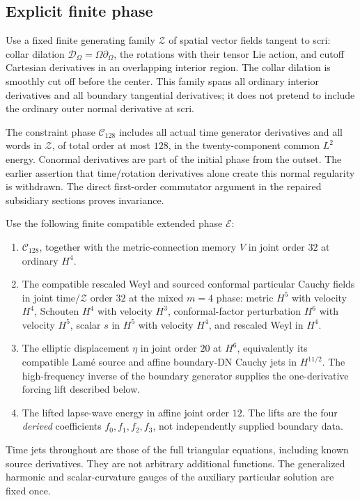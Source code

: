 \subsection{Explicit finite phase}
Use a fixed finite generating family $\mathcal Z$ of spatial vector fields
tangent to scri: collar dilation
$\mathcal D_\Omega=\Omega\partial_\Omega$, the rotations with their tensor
Lie action, and cutoff Cartesian derivatives in an overlapping interior
region. The collar dilation is smoothly cut off before the center.
This family spans all ordinary interior derivatives and all boundary
tangential derivatives; it does not pretend to include the ordinary
outer normal derivative at scri.

The constraint phase $\mathcal C_{128}$ includes all actual time
generator derivatives and all words in $\mathcal Z$, of total order
at most $128$, in the twenty-component common $L^2$ energy.
Conormal derivatives are part of the initial phase from the outset.
The earlier assertion that time/rotation derivatives alone create this
normal regularity is withdrawn. The direct first-order commutator
argument in the repaired subsidiary sections proves invariance.

Use the following finite compatible extended phase $\mathcal E$:
\begin{enumerate}
\item $\mathcal C_{128}$, together with the metric-connection memory
$V$ in joint order $32$ at ordinary $H^4$.
\item The compatible rescaled Weyl and sourced conformal particular
Cauchy fields in joint time/$\mathcal Z$ order $32$ at the mixed
$m=4$ phase: metric $H^5$ with velocity $H^4$,
Schouten $H^4$ with velocity $H^3$, conformal-factor perturbation
$H^6$ with velocity $H^5$, scalar $s$ in $H^5$ with velocity $H^4$,
and rescaled Weyl in $H^4$.
\item The elliptic displacement $\eta$ in joint order $20$ at $H^6$,
equivalently its compatible Lam\'e source and affine boundary-DN
Cauchy jets in $H^{11/2}$. The high-frequency inverse of the boundary
generator supplies the one-derivative forcing lift described below.
\item The lifted lapse-wave energy in affine joint order $12$.
The lifts are the four \emph{derived} coefficients
$f_0,f_1,f_2,f_3$, not independently supplied boundary data.
\end{enumerate}
Time jets throughout are those of the full triangular equations, including
known source derivatives. They are not arbitrary additional functions.
The generalized harmonic and scalar-curvature gauges of the auxiliary
particular solution are fixed once.

